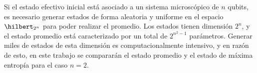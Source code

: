 Si el estado efectivo inicial está asociado a un sistema microscópico de $n$ qubits, es necesario generar estados de forma aleatoria y uniforme en el espacio $\hilbert_{2^{n}}$ para poder realizar el promedio. Los estados tienen dimensión $2^{n}$, y el estado promedio está caracterizado por un total de $2^{n^{2}-1}$ parámetros. Generar miles de estados de esta dimensión es computacionalmente intensivo, y en razón de esto, en este trabajo se compararán el estado promedio y el estado de máxima entropía para el caso $n=2$.
